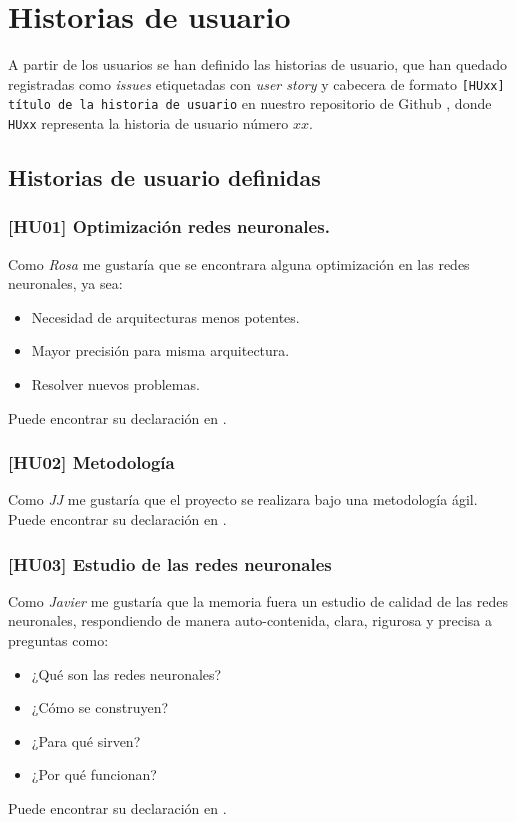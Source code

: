 \section{Historias de usuario}   \label{ch:metodología_personas_historias_de_usuario}

A partir de los usuarios se han definido las historias de usuario, que han quedado registradas 
como \textit{issues} etiquetadas con \textit{user story} y cabecera de formato
\texttt{[HUxx] título de la historia de usuario} en nuestro 
repositorio de Github \cite{TFG-Estudio-de-las-redes-neuronales},
 donde \texttt{HUxx} representa
la historia de usuario número $xx$.   

\subsection{Historias de usuario definidas} 

\subsubsection*{[HU01] Optimización redes neuronales.}
    Como \textit{Rosa} me gustaría que se encontrara alguna optimización en las redes neuronales, ya sea:
\begin{itemize}
    \item  Necesidad de arquitecturas menos potentes.
    \item  Mayor precisión para misma arquitectura.
    \item  Resolver nuevos problemas.
\end{itemize}
Puede encontrar su declaración en \cite{TFG-Estudio-de-las-redes-neuronales-HU01}. 

\subsubsection*{ [HU02] Metodología}

Como \textit{JJ} me gustaría que el proyecto se realizara bajo una metodología ágil.
Puede encontrar su declaración en \cite{TFG-Estudio-de-las-redes-neuronales-HU02}. 

\subsubsection*{ [HU03] Estudio de las redes neuronales}
Como \textit{Javier} me gustaría que la memoria fuera un estudio de calidad de las redes neuronales, 
respondiendo de manera auto-contenida, clara, rigurosa y precisa a preguntas como:
\begin{itemize}
    \item ¿Qué son las redes neuronales?
    \item ¿Cómo se construyen?
    \item ¿Para qué sirven?
    \item ¿Por qué funcionan?
\end{itemize}
Puede encontrar su declaración en \cite{TFG-Estudio-de-las-redes-neuronales-HU03}.

